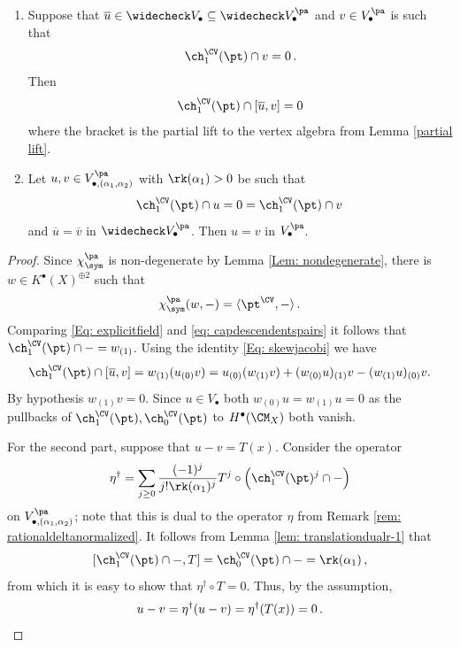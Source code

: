 \begin{lemma}
\notready\label{lem: liftvertexalgebra}
\begin{enumerate}
\item[a)]
Suppose that $\overline{u}\in \widecheck V_\bullet\subseteq \widecheck V_\bullet^{\pa}$ and $v\in V_\bullet^{\pa}$ is such that \[\ch_1^\CV(\pt)\cap v=0\,.\] Then
\[\ch_1^\CV(\pt)\cap [\overline u, v]=0\]
where the bracket is the partial lift to the vertex algebra from Lemma \ref{partial lift}.
\item[b)] Let $u,v\in V_{\bullet, (\alpha_1, \alpha_2)}^{\pa}$ with $\rk(\alpha_1)>0$ be such that
\[\ch_1^\CV(\pt)\cap u=0=\ch_1^\CV(\pt)\cap v\,\]
and $\overline u=\overline v$ in $\widecheck V_\bullet^{\pa}$. Then $u=v$ in $V_\bullet^{\pa}$.
\end{enumerate}
\end{lemma}
\begin{proof}
Since $\chi_\sym^{\pa}$ is non-degenerate by Lemma \ref{Lem: nondegenerate}, there is $w\in K^\bullet(X)^{\oplus 2}$ such that \[\chi_\sym^{\pa}(w, -)=\langle \pt^\CV, -\rangle\,.\]
Comparing \eqref{Eq: explicitfield} and \eqref{eq: capdescendentspairs} it follows that $\ch_1^\CV(\pt)\cap -=w_{(1)}$. Using the identity \eqref{Eq: skewjacobi} we have
\[\ch_1^\CV(\pt)\cap [\overline u, v]=w_{(1)}(u_{(0)}v)=u_{(0)}(w_{(1)} v)+(w_{(0)} u)_{(1)} v-(w_{(1)} u)_{(0)} v.\]
By hypothesis $w_{(1)} v=0$. Since $u\in V_\bullet$ both $w_{(0)} u=w_{(1)} u=0$ as the pullbacks of $\ch_1^\CV(\pt), \ch_0^\CV(\pt)$ to $H^\bullet(\CM_X)$ both vanish.

For the second part, suppose that $u-v=T(x)$. Consider the operator
\[\eta^\dagger=\sum_{j\geq 0}\frac{(-1)^j}{j!\rk(\alpha_1)^j}T^j\circ \left(\ch_1^\CV(\pt)^j\cap -\right)\]
on $V_{\bullet, (\alpha_1, \alpha_2)}^{\pa}$; note that this is dual to the operator $\eta$ from Remark \ref{rem: rationaldeltanormalized}. It follows from Lemma \ref{lem: translationdualr-1} that
\[[\ch_1^\CV(\pt)\cap -, T]=\ch_0^\CV(\pt)\cap -=\rk(\alpha_1)\,,\]
from which it is easy to show that $\eta^\dagger\circ T=0$. Thus, by the assumption,
\[u-v=\eta^\dagger(u-v)=\eta^\dagger(T(x))=0\,.\qedhere\]




\end{proof}

